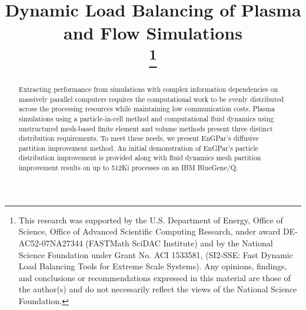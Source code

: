 \documentclass[conference]{IEEEtran}
\begin{document}
\title{Dynamic Load Balancing of Plasma and Flow Simulations\\
\thanks{
This research was supported by the U.S. Department of Energy, Office of
Science, Office of Advanced Scientific Computing Research, under award
DE-AC52-07NA27344 (FASTMath SciDAC Institute) and by the National Science
Foundation under Grant No.  ACI 1533581, (SI2-SSE: Fast Dynamic Load
Balancing Tools for Extreme Scale Systems).
Any opinions, findings, and conclusions or recommendations expressed in this
material are those of the author(s) and do not necessarily reflect the views
of the National Science Foundation.
}}

\author{
\and
{}
\and
{}
\and
{}
}

\maketitle

\begin{abstract}
  Extracting performance from simulations with complex information dependencies
  on massively parallel computers requires the computational work to be evenly
  distributed across the processing resources while maintaining low
  communication costs.
  Plasma simulations using a particle-in-cell method and computational fluid
  dynamics using unstructured mesh-based finite element and volume
  methods present three distinct distribution requirements.
  To meet these needs, we present EnGPar's diffusive partition improvement
  method.
  An initial demonstration of EnGPar's particle distribution improvement is
  provided along with fluid dynamics mesh partition improvement results on up to
  512Ki processes on an IBM BlueGene/Q.
\end{abstract}
\end{document}
